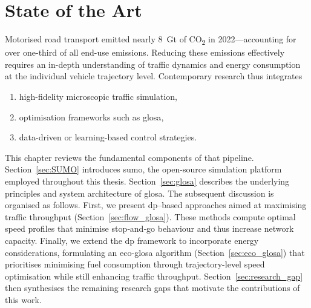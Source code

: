 \chapter{State of the Art}
\label{ch:State_of_the_Art}

Motorised road transport emitted nearly \SI{8}{\giga\tonne} of CO\textsubscript{2} in 2022—accounting for over one-third of all end-use emissions. \cite{IEATransport2024}  
Reducing these emissions effectively requires an in-depth understanding of traffic dynamics and energy consumption at the individual vehicle trajectory level.   
Contemporary research thus integrates  
\begin{enumerate}[label=(\roman*)]
  \item high-fidelity microscopic traffic simulation,
  \item optimisation frameworks such as \ac{glosa},
  \item data-driven or learning-based control strategies.
\end{enumerate}
This chapter reviews the fundamental components of that pipeline. Section~\ref{sec:SUMO} introduces \ac{sumo}, the open-source simulation platform employed throughout this thesis. Section~\ref{sec:glosa} describes the underlying principles and system architecture of \ac{glosa}.
\mynewline
The subsequent discussion is organised as follows. First, we present \ac{dp}–based approaches aimed at maximising traffic throughput (Section~\ref{sec:flow_glosa}). These methods compute optimal speed profiles that minimise stop‐and‐go behaviour and thus increase network capacity. Finally, we extend the \ac{dp} framework to incorporate energy considerations, formulating an \ac{eco-glosa} algorithm (Section~\ref{sec:eco_glosa}) that prioritises minimising fuel consumption through trajectory-level speed optimisation while still enhancing traffic throughput.
\mynewline
Section~\ref{sec:research_gap} then synthesises the remaining research gaps that motivate the contributions of this work.  





